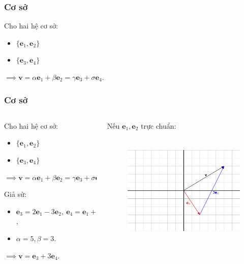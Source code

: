 \begin{frame}
    \frametitle{Cơ sở}
    Cho hai hệ cơ sở:
               \begin{itemize}
                  \item \(\{\mathbf{e}_1 ,\mathbf{e}_2\}\) 
                \item \(\{\mathbf{e}_3 ,\mathbf{e}_4\}\) 
                \end{itemize}
                \(\implies \mathbf{v}=\alpha\mathbf{e}_1 +\beta\mathbf{e}_2 =\gamma\mathbf{e}_3 +\sigma\mathbf{e}_{4}.\)
\end{frame}
\begin{frame}
    \frametitle{Cơ sở}
    \begin{columns}
        \begin{column}{0.45\textwidth}
            Cho hai hệ cơ sở:
               \begin{itemize}
                  \item \(\{\mathbf{e}_1 ,\mathbf{e}_2\}\) 
                \item \(\{\mathbf{e}_3 ,\mathbf{e}_4\}\) 
                \end{itemize}
                \(\implies \mathbf{v}=\alpha\mathbf{e}_1 +\beta\mathbf{e}_2 =\gamma\mathbf{e}_3 +\sigma\mathbf{e}_{4}.\)

                Giả sử: 
                \begin{itemize}
                \item \(\mathbf{e}_3 =2\mathbf{e}_1 -3\mathbf{e}_2 ,~\mathbf{e}_4 =\mathbf{e}_1 +2\mathbf{e}_2\),
                \item \(\alpha=5, \beta =3\).
                \end{itemize}
                \(\implies \mathbf{v}=\mathbf{e}_3 +3\mathbf{e}_4\).
        \end{column}
        \begin{column}{0.55\textwidth}
            Nếu \(\mathbf{e}_1 ,\mathbf{e}_2\) trực chuẩn:
            \begin{figure}[htps]
                \centering
                \includegraphics[width=7cm, height=5.5cm]{Slides/Figure/e3e4.png}
            \end{figure}
        \end{column}
    \end{columns}
\end{frame}

